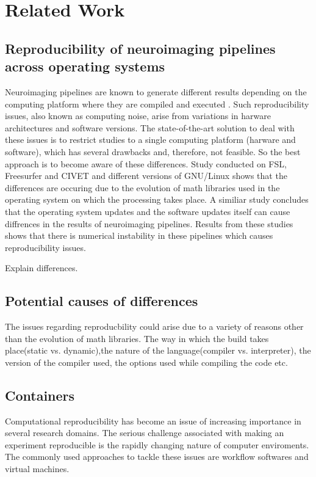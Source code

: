 \chapter{Related Work}

\section{Reproducibility of neuroimaging pipelines across operating systems}
Neuroimaging pipelines are known to generate different results depending on the computing platform where they are compiled and executed \cite{Gla15}. Such reproducibility issues, also known as computing noise, arise from variations in harware architectures and software versions. The state-of-the-art solution to deal with these issues is to restrict studies to a single computing platform (harware and software), which has several drawbacks and, therefore, not feasible. So the best approach is to become aware of these differences.
Study conducted on FSL, Freesurfer and CIVET and different versions of GNU/Linux \cite{Gla15} shows that the differences are occuring due to the evolution of math libraries used in the operating system on which the processing takes place. A similiar study \cite{10.1371/journal.pone.0038234} concludes that the operating system updates and the software updates itself can cause diffrences in the results of neuroimaging pipelines. Results from these studies shows that there is numerical instability in these pipelines which causes reproducibility issues.

Explain differences.

\section{Potential causes of differences}
The issues regarding reproducbility could arise due to a variety of reasons other than the evolution of math libraries. The way in which the build takes place(static vs. dynamic),the nature of the language(compiler vs. interpreter), the version of the compiler used, the options used while compiling the code etc. 

\section{Containers}
Computational reproducibility has become an issue of increasing importance in several research domains.	The serious challenge associated with making an experiment reproducible is the rapidly changing nature of computer enviroments. The commonly used approaches to tackle these issues are workflow softwares and virtual machines.

